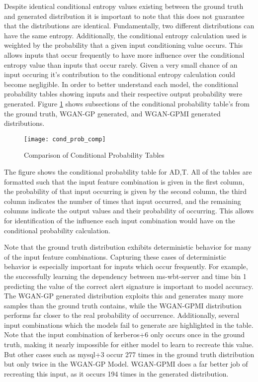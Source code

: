Despite identical conditional entropy values existing between the ground truth and generated distribution it is important to note that this does not guarantee that the distributions are identical. Fundamentally, two different distributions can have the same entropy. Additionally, the conditional entropy calculation used is weighted by the probability that a given input conditioning value occurs. This allows inputs that occur frequently to have more influence over the conditional entropy value than inputs that occur rarely. Given a very small chance of an input occuring it's contribution to the conditional entropy calculation could become negligible. In order to better understand each model, the conditional probability tables showing inputs and their respective output probability were generated. Figure \ref{fig:make_this} shows subsections of the conditional probability table's from the ground truth, WGAN-GP generated, and WGAN-GPMI generated distributions.

\begin{figure}[!htbp]
	\centering
	\texttt{[image: cond\_prob\_comp]}
	\caption{
		Comparison of Conditional Probability Tables
	}
	\label{fig:make_this}
\end{figure}

The figure shows the conditional probability table for A{\given}D,T. All of the tables are formatted such that the input feature combination is given in the first column, the probability of that input occurring is given by the second column, the third column indicates the number of times that input occurred, and the remaining columns indicate the output values and their probability of occurring. This allows for identification of the influence each input combination would have on the conditional probability calculation.

Note that the ground truth distribution exhibits deterministic behavior for many of the input feature combinations. Capturing these cases of deterministic behavior is especially important for inputs which occur frequently. For example, the successfully learning the dependency between ms-wbt-server and time bin 1 predicting the value of the correct alert signature is important to model accuracy. The WGAN-GP generated distribution exploits this and generates many more samples than the ground truth contains, while the WGAN-GPMI distribution performs far closer to the real probability of occurrence. Additionally, several input combinations which the models fail to generate are highlighted in the table. Note that the input combination of kerberos+6 only occurs once in the ground truth, making it nearly impossible for either model to learn to recreate this value. But other cases such as mysql+3 occur 277 times in the ground truth distribution but only twice in the WGAN-GP Model. WGAN-GPMI does a far better job of recreating this input, as it occurs 194 times in the generated distribution.

